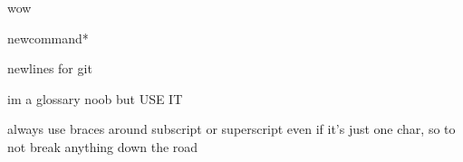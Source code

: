 wow

newcommand*

newlines for git

im a glossary noob but USE IT

always use braces around subscript or superscript even if it's just one char, so to not break anything down the road